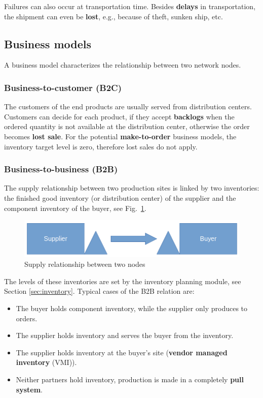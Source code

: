 \documentclass{article}
\begin{document}
Failures can also occur at transportation time. Besides \textbf{delays} in transportation, the shipment can even be \textbf{lost}, e.g., because of theft, sunken ship, etc.


\subsection{Business models}

A business model characterizes the relationship between two network nodes.

\subsubsection{Business-to-customer (B2C)}

The customers of the end products are usually served from distribution centers. Customers can decide for each product, if they accept \textbf{backlogs} when the ordered quantity is not available at the distribution center, otherwise the order becomes \textbf{lost sale}. For the potential \textbf{make-to-order} business models, the inventory target level is zero, therefore lost sales do not apply.


\subsubsection{Business-to-business (B2B)}

The supply relationship between two production sites is linked by two inventories: the finished good inventory (or distribution center) of the supplier and the component inventory of the buyer, see Fig.~\ref{fig:b2b}.

\begin{figure}[ht!]
	\center
	\includegraphics[width=\textwidth]{b2b.png} 
	\caption{Supply relationship between two nodes}\label{fig:b2b}
\end{figure}

The levels of these inventories are set by the inventory planning module, see Section \ref{sec:inventory}. Typical cases of the B2B relation are:

\begin{itemize}
\item The buyer holds component inventory, while the supplier only produces to orders.
\item The supplier holds inventory and serves the buyer from the inventory.
\item The supplier holds inventory at the buyer's site (\textbf{vendor managed inventory} (VMI)).
\item Neither partners hold inventory, production is made in a completely \textbf{pull system}.
\end{itemize}
\end{document}
